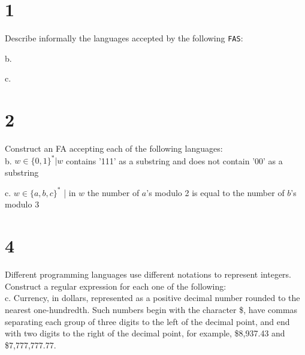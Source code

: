 \documentclass[11pt]{article}
\begin{document}
\section*{1}
Describe informally the languages accepted by the following \verb|FAS|:

b.
\begin{Answer}
\end{Answer}

c.
\begin{Answer}
\end{Answer}

\newpage

\section*{2}
Construct an FA accepting each of the following languages: \\

b. $w \in \{0, 1\}^* | w$ contains '111' as a substring and does not contain '00' as a substring
\begin{Answer}
\end{Answer}

c. $w \in \{a, b, c\}^*$ | in $w$ the number of $a$'s modulo 2 is equal to the number of $b$'s modulo 3
\begin{Answer}
\end{Answer}

\newpage

\section*{4}
Different programming languages use different notations to represent integers. Construct a regular expression for each one of the following: \\

c. Currency, in dollars, represented as a positive decimal number rounded to the nearest one-hundredth. Such numbers begin with the character \$, have commas separating each group of three digits to the left of the decimal point, and end with two digits to the right of the decimal point, for example, \$8,937.43 and \$7,777,777.77.
\end{document}
